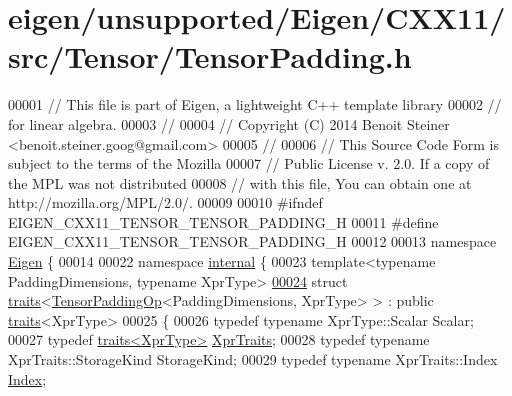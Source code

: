 \hypertarget{eigen_2unsupported_2_eigen_2_c_x_x11_2src_2_tensor_2_tensor_padding_8h_source}{}\section{eigen/unsupported/\+Eigen/\+C\+X\+X11/src/\+Tensor/\+Tensor\+Padding.h}
\label{eigen_2unsupported_2_eigen_2_c_x_x11_2src_2_tensor_2_tensor_padding_8h_source}

\begin{DoxyCode}
00001 \textcolor{comment}{// This file is part of Eigen, a lightweight C++ template library}
00002 \textcolor{comment}{// for linear algebra.}
00003 \textcolor{comment}{//}
00004 \textcolor{comment}{// Copyright (C) 2014 Benoit Steiner <benoit.steiner.goog@gmail.com>}
00005 \textcolor{comment}{//}
00006 \textcolor{comment}{// This Source Code Form is subject to the terms of the Mozilla}
00007 \textcolor{comment}{// Public License v. 2.0. If a copy of the MPL was not distributed}
00008 \textcolor{comment}{// with this file, You can obtain one at http://mozilla.org/MPL/2.0/.}
00009 
00010 \textcolor{preprocessor}{#ifndef EIGEN\_CXX11\_TENSOR\_TENSOR\_PADDING\_H}
00011 \textcolor{preprocessor}{#define EIGEN\_CXX11\_TENSOR\_TENSOR\_PADDING\_H}
00012 
00013 \textcolor{keyword}{namespace }\hyperlink{namespace_eigen}{Eigen} \{
00014 
00022 \textcolor{keyword}{namespace }\hyperlink{namespaceinternal}{internal} \{
00023 \textcolor{keyword}{template}<\textcolor{keyword}{typename} PaddingDimensions, \textcolor{keyword}{typename} XprType>
\hyperlink{struct_eigen_1_1internal_1_1traits_3_01_tensor_padding_op_3_01_padding_dimensions_00_01_xpr_type_01_4_01_4}{00024} \textcolor{keyword}{struct }\hyperlink{struct_eigen_1_1internal_1_1traits}{traits}<\hyperlink{class_eigen_1_1_tensor_padding_op}{TensorPaddingOp}<PaddingDimensions, XprType> > : \textcolor{keyword}{public} 
      \hyperlink{struct_eigen_1_1internal_1_1traits}{traits}<XprType>
00025 \{
00026   \textcolor{keyword}{typedef} \textcolor{keyword}{typename} XprType::Scalar Scalar;
00027   \textcolor{keyword}{typedef} \hyperlink{struct_eigen_1_1internal_1_1traits}{traits<XprType>} \hyperlink{struct_eigen_1_1internal_1_1traits}{XprTraits};
00028   \textcolor{keyword}{typedef} \textcolor{keyword}{typename} XprTraits::StorageKind StorageKind;
00029   \textcolor{keyword}{typedef} \textcolor{keyword}{typename} XprTraits::Index \hyperlink{namespace_eigen_a62e77e0933482dafde8fe197d9a2cfde}{Index};

\end{DoxyCode}
